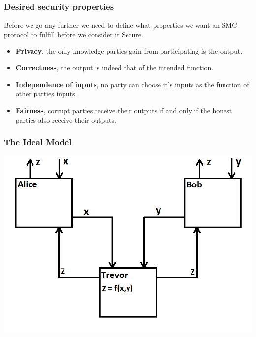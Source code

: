 \documentclass{beamer}
\begin{document}
	\begin{frame}
		\frametitle{Desired security properties}

		Before we go any further we need to define what properties we want an SMC protocol to fulfill before we consider it Secure.
		
		\begin{itemize}
			\item \textbf{Privacy}, the only knowledge parties gain from participating is the output.
			\item \textbf{Correctness}, the output is indeed that of the intended function.
			\item \textbf{Independence of inputs}, no party can choose it's inputs as the function of other parties inputs.
			\item \textbf{Fairness}, corrupt parties receive their outputs if and only if the honest parties also receive their outputs.
		\end{itemize}

	\end{frame}


	\begin{frame}
		\frametitle{The Ideal Model}

		\includegraphics[scale=0.6]{Images/IdealModel}
	\end{frame}
\end{document}
